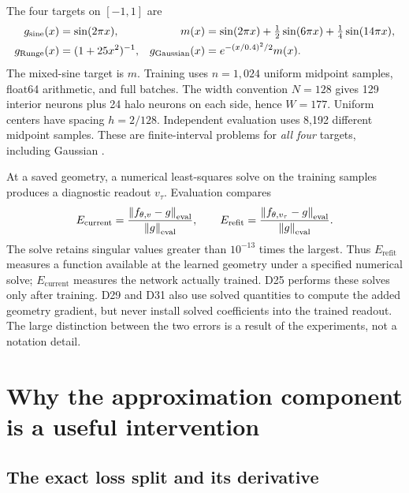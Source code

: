 \documentclass[11pt]{article}
\newcommand{\norm}[1]{\left\lVert#1\right\rVert}
\newcommand{\Eref}{E_{\mathrm{refit}}}
\newcommand{\Ecur}{E_{\mathrm{current}}}
\begin{document}
The four targets on $[-1,1]$ are
\begin{align}
 g_{\rm sine}(x)&=\sin(2\pi x), &
 m(x)&=\sin(2\pi x)+\tfrac12\sin(6\pi x)+\tfrac14\sin(14\pi x),\\
 g_{\rm Runge}(x)&=(1+25x^2)^{-1},&
 g_{\rm Gaussian}(x)&=e^{-(x/0.4)^2/2}m(x).
\end{align}
The mixed-sine target is $m$. Training uses $n=1{,}024$ uniform midpoint samples, float64 arithmetic, and full batches. The width convention $N=128$ gives 129 interior neurons plus 24 halo neurons on each side, hence $W=177$. Uniform centers have spacing $h=2/128$. Independent evaluation uses 8,192 different midpoint samples. These are finite-interval problems for \emph{all four} targets, including Gaussian \cite{D25,D29,D31}.

At a saved geometry, a numerical least-squares solve on the training samples produces a diagnostic readout $v_\tau$. Evaluation compares
\begin{equation}
 \Ecur=\frac{\norm{f_{\theta,v}-g}_{\rm eval}}{\norm{g}_{\rm eval}},
 \qquad
 \Eref=\frac{\norm{f_{\theta,v_\tau}-g}_{\rm eval}}{\norm{g}_{\rm eval}}.
 \label{eq:errors}
\end{equation}
The solve retains singular values greater than $10^{-13}$ times the largest. Thus $\Eref$ measures a function available at the learned geometry under a specified numerical solve; $\Ecur$ measures the network actually trained. D25 performs these solves only after training. D29 and D31 also use solved quantities to compute the added geometry gradient, but never install solved coefficients into the trained readout. The large distinction between the two errors is a result of the experiments, not a notation detail.

\section{Why the approximation component is a useful intervention}

\subsection{The exact loss split and its derivative}
\end{document}
